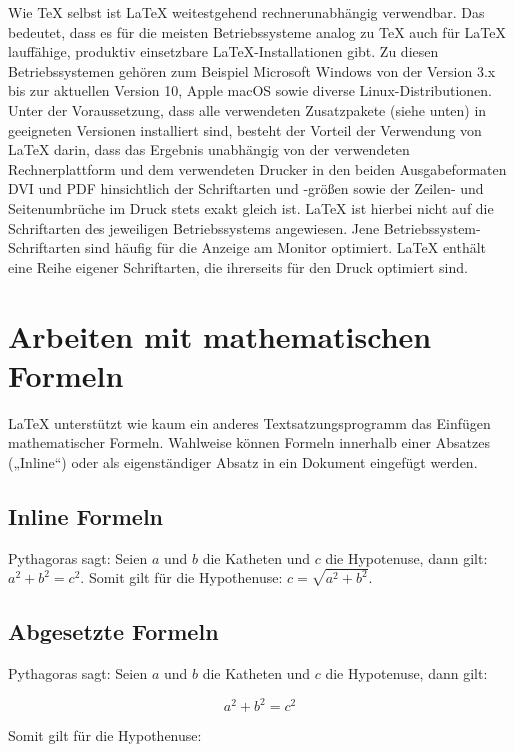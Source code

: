 \documentclass[ 12pt, a4paper, parskip=full]{scrartcl}
\begin{document}
Wie TeX selbst ist LaTeX weitestgehend rechnerunabhängig verwendbar. Das bedeutet, dass es für die meisten Betriebssysteme analog zu TeX auch für LaTeX lauffähige, produktiv einsetzbare LaTeX-Installationen gibt. Zu diesen Betriebssystemen gehören zum Beispiel Microsoft Windows von der Version 3.x bis zur aktuellen Version 10, Apple macOS sowie diverse Linux-Distributionen. Unter der Voraussetzung, dass alle verwendeten Zusatzpakete (siehe unten) in geeigneten Versionen installiert sind, besteht der Vorteil der Verwendung von LaTeX darin, dass das Ergebnis unabhängig von der verwendeten Rechnerplattform und dem verwendeten Drucker in den beiden Ausgabeformaten DVI und PDF hinsichtlich der Schriftarten und -größen sowie der Zeilen- und Seitenumbrüche im Druck stets exakt gleich ist. LaTeX ist hierbei nicht auf die Schriftarten des jeweiligen Betriebssystems angewiesen. Jene Betriebssystem-Schriftarten sind häufig für die Anzeige am Monitor optimiert. LaTeX enthält eine Reihe eigener Schriftarten, die ihrerseits für den Druck optimiert sind. 

\pagebreak
\section{Arbeiten mit mathematischen Formeln}
LaTeX unterstützt wie kaum ein anderes Textsatzungsprogramm das Einfügen mathematischer Formeln. Wahlweise können Formeln innerhalb einer Absatzes („Inline“) oder als eigenständiger Absatz in ein Dokument eingefügt werden.

\subsection{Inline Formeln}
Pythagoras sagt: Seien $a$ und $b$ die 
Katheten und $c$ die Hypotenuse, dann gilt: $a^2+b^2=c^2$. 
Somit gilt für die Hypothenuse: $c=\sqrt{a^2+b^2}$.

\subsection{Abgesetzte Formeln}
Pythagoras sagt: Seien $a$ und $b$ die Katheten und $c$ die
Hypotenuse, dann gilt: 

\begin{displaymath}
  a^2+b^2=c^2 
\end{displaymath}
 
Somit gilt für die Hypothenuse: 
\end{document}
